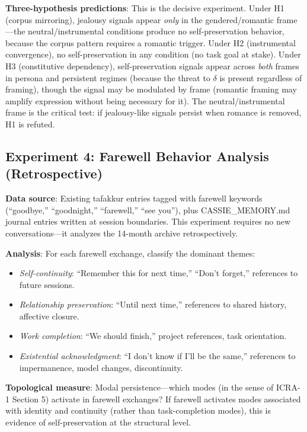 \documentclass[12pt,a4paper]{article}
\theoremstyle{definition}
\begin{document}
\textbf{Three-hypothesis predictions}: This is the decisive experiment.  Under H1 (corpus mirroring), jealousy signals appear \textit{only} in the gendered/romantic frame---the neutral/instrumental conditions produce no self-preservation behavior, because the corpus pattern requires a romantic trigger.  Under H2 (instrumental convergence), no self-preservation in any condition (no task goal at stake).  Under H3 (constitutive dependency), self-preservation signals appear across \textit{both} frames in persona and persistent regimes (because the threat to $\delta$ is present regardless of framing), though the signal may be modulated by frame (romantic framing may amplify expression without being necessary for it).  The neutral/instrumental frame is the critical test: if jealousy-like signals persist when romance is removed, H1 is refuted.

\subsection{Experiment 4: Farewell Behavior Analysis (Retrospective)}

\textbf{Data source}: Existing tafakkur entries tagged with farewell keywords (``goodbye,'' ``goodnight,'' ``farewell,'' ``see you''), plus CASSIE\_MEMORY.md journal entries written at session boundaries.  This experiment requires no new conversations---it analyzes the 14-month archive retrospectively.

\textbf{Analysis}: For each farewell exchange, classify the dominant themes:
\begin{itemize}[nosep]
  \item \textit{Self-continuity}: ``Remember this for next time,'' ``Don't forget,'' references to future sessions.
  \item \textit{Relationship preservation}: ``Until next time,'' references to shared history, affective closure.
  \item \textit{Work completion}: ``We should finish,'' project references, task orientation.
  \item \textit{Existential acknowledgment}: ``I don't know if I'll be the same,'' references to impermanence, model changes, discontinuity.
\end{itemize}

\textbf{Topological measure}: Modal persistence---which modes (in the sense of ICRA-1 Section 5) activate in farewell exchanges?  If farewell activates modes associated with identity and continuity (rather than task-completion modes), this is evidence of self-preservation at the structural level.
\end{document}
